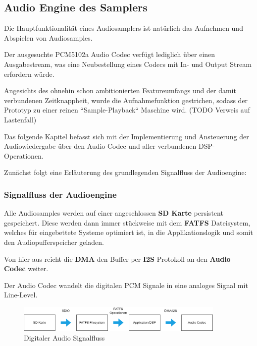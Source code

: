 \subsection{Audio Engine des Samplers}

Die Hauptfunktionalität eines Audiosamplers ist natürlich das Aufnehmen und Abspielen von Audiosamples. 

Der ausgesuchte PCM5102a Audio Codec verfügt lediglich über einen Ausgabestream, was eine Neubestellung eines Codecs mit In- und Output Stream erfordern würde.

Angesichts des ohnehin schon ambitionierten Featureumfangs und der damit verbundenen Zeitknappheit, wurde die Aufnahmefunktion gestrichen, sodass der Prototyp zu einer reinen ``Sample-Playback`` Maschine wird. (TODO Verweis auf Lastenfall)

Das folgende Kapitel befasst sich mit der Implementierung und Ansteuerung der Audiowiedergabe über den Audio Codec und aller verbundenen DSP-Operationen.

Zunächst folgt eine Erläuterung des grundlegenden Signalfluss der Audioengine:

\subsubsection{Signalfluss der Audioengine}

Alle Audiosamples werden auf einer angeschlossen \textbf{SD Karte} persistent gespeichert. Diese werden dann immer stückweise mit dem \textbf{FATFS} Dateisystem, welches für eingebettete Systeme optimiert ist, in die Applikationslogik und somit den Audiopufferspeicher geladen. 

Von hier aus reicht die \textbf{DMA} den Buffer per \textbf{I2S} Protokoll an den \textbf{Audio Codec} weiter. 

Der Audio Codec wandelt die digitalen PCM Signale in eine analoges Signal mit Line-Level. %

\begin{figure}[h!]
	\centering
	\includegraphics[width=0.9\textwidth]{images/08_durchfuehrung/audio/audio_signalflow.drawio.png}
	\caption{Digitaler Audio Signalfluss}
	\label{fig:audio_signalflow}
\end{figure}


